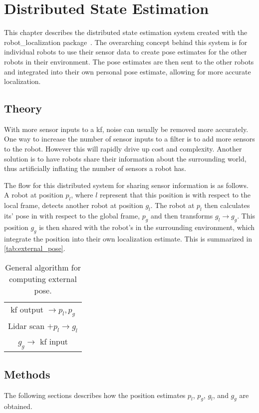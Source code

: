 \documentclass[thesis.tex]{subfile}
\begin{document}
\chapter{Distributed State Estimation} \label{Distributed State Estimation}
This chapter describes the distributed state estimation system created with the robot\_localization package~\cite{MooreStouch2014, Moore}. The overarching concept behind this system is for individual robots to use their sensor data to create pose estimates for the other robots in their environment. The pose estimates are then sent to the other robots and integrated into their own personal pose estimate, allowing for more accurate localization.
  
\section{Theory} \label{Theory}
With more sensor inputs to a \gls{kf}, noise can usually be removed more accurately. One way to increase the number of sensor inputs to a filter is to add more sensors to the robot. However this will rapidly drive up cost and complexity. Another solution is to have robots share their information about the surrounding world, thus artificially inflating the number of sensors a robot has.

The flow for this distributed system for sharing sensor information is as follows. A robot at position $p_l$, where $l$ represent that this position is with respect to the local frame, detects another robot at position $g_l$. The robot at $p_l$ then calculates its' pose in with respect to the global frame, $p_g$ and then transforms $g_l \rightarrow g_g$. This position $g_g$ is then shared with the robot's in the surrounding environment, which integrate the position into their own localization estimate. This is summarized in \autoref{tab:external_pose}.

\begin{table}
\centering
\begin{tabular}{c}
 \gls{kf} output $\rightarrow p_l, p_g$ \\
Lidar scan $+ p_l \rightarrow g_l$ \\
$g_g \rightarrow$ \gls{kf} input
\end{tabular}
\caption{General algorithm for computing external pose.}
\label{tab:external_pose}
\end{table}

\section{Methods}
The following sections describes how the position estimates $p_l$, $p_g$, $g_l$, and $g_g$ are obtained.
\end{document}
